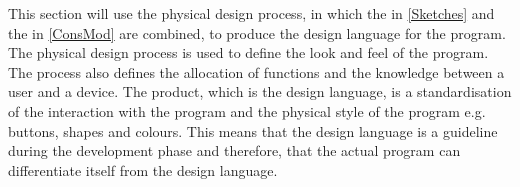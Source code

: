 This section will use the physical design process, in which the  in \cref{Sketches} and the  in \cref{ConsMod} are combined, to produce the design language for the program. The physical design process is used to define the look and feel of the program. The process also defines the allocation of functions and the knowledge between a user and a device. The product, which is the design language, is a standardisation of the interaction with the program and the physical style of the program e.g. buttons, shapes and colours. This means that the design language is a guideline during the development phase and therefore, that the actual program can differentiate itself from the design language.